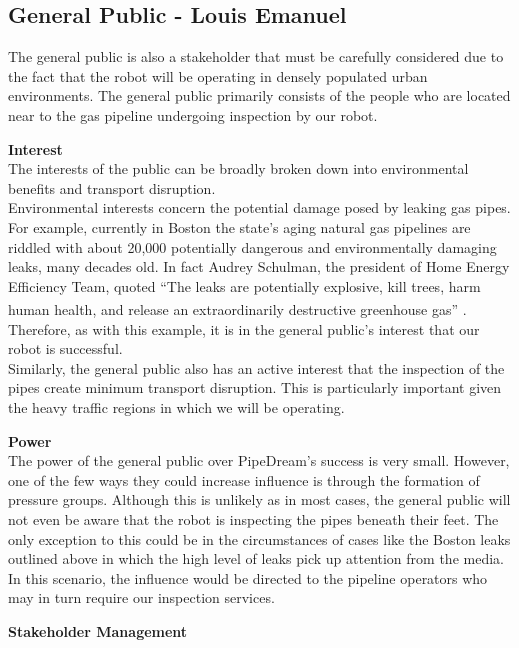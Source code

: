 \documentclass[11pt]{article}		%
\newcommand{\supercite}[1]{\textsuperscript{\cite{#1}}}		%
\begin{document}
		\subsection[General Public]{General Public - Louis Emanuel}
			The general public is also a stakeholder that must be carefully considered due to the fact that the robot will be operating in densely populated urban environments. The general public primarily consists of the people who are located near to the gas pipeline undergoing inspection by our robot.
			
			\textbf{Interest}\\
	        The interests of the public can be broadly broken down into environmental benefits and transport disruption.\\
		    \hspace*{3ex}Environmental interests concern the potential damage posed by leaking gas pipes. For example, currently in Boston the state’s aging natural gas pipelines are riddled with about 20,000 potentially dangerous and environmentally damaging leaks, many decades old. In fact Audrey Schulman, the president of Home Energy Efficiency Team, quoted  “The leaks are potentially explosive, kill trees, harm human health, and release an extraordinarily destructive greenhouse gas” \supercite{leaks}. Therefore, as with this example, it is in the general public's interest that our robot is successful. \\
	        \hspace*{3ex}Similarly, the general public also has an active interest that the inspection of the pipes create minimum transport disruption. This is particularly important given the heavy traffic regions in which we will be operating. 
	        
	        \textbf{Power}\\
	        The power of the general public over PipeDream's success is very small. However, one of the few ways they could increase influence is through the formation of pressure groups. Although this is unlikely as in most cases, the general public will not even be aware that the robot is inspecting the pipes beneath their feet. The only exception to this could be in the circumstances of cases like the Boston leaks outlined above in which the high level of leaks pick up attention from the media. In this scenario, the influence would be directed to the pipeline operators who may in turn require our inspection services.
	        
	        \textbf{Stakeholder Management}
	        
\end{document}
